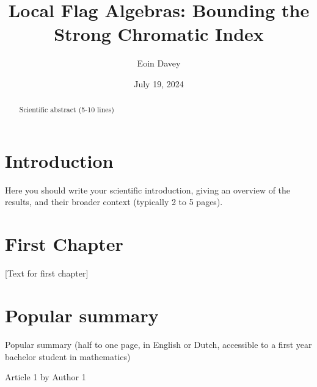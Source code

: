 \documentclass{uvamath}
\title{Local Flag Algebras: Bounding the Strong Chromatic Index} %
\author[eoin.davey@student.uva.nl, 14246287]{Eoin Davey} %
\date{July 19, 2024} %
\begin{document}
\maketitle

\begin{abstract}
Scientific abstract (5-10 lines)
\end{abstract}

\tableofcontents

\chapter*{Introduction}
Here you should write your scientific introduction, giving an overview of the results, and their broader context (typically 2 to 5 pages).

\chapter{First Chapter}
[Text for first chapter]


\chapter*{Popular summary}
Popular summary (half to one page, in English or Dutch, accessible to a first year bachelor student in mathematics)


\begin{thebibliography}{10}
 Article 1 by Author 1
 \end{thebibliography}
\end{document}
